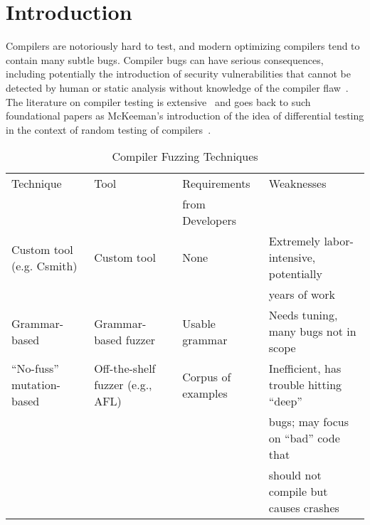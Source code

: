 \section{Introduction}

Compilers are notoriously hard to test, and modern optimizing
compilers tend to contain many subtle bugs.  Compiler bugs can have
serious consequences, including potentially the introduction of
security vulnerabilities that cannot be detected by human or static
analysis without knowledge of the compiler flaw~\cite{CompBug}.   The
literature on compiler testing is extensive~\cite{chen2020survey} and
goes back to such foundational papers as McKeeman's introduction of
the idea of differential testing in the context of random testing of
compilers~\cite{Differential}.

\begin{table*}
\centering
\begin{tabular}{l|l|l|l}
  \toprule
  Technique &  Tool & Requirements & Weaknesses \\
  & & from Developers & \\
  \midrule
  Custom tool (e.g. Csmith) & Custom tool & None & Extremely
                                                   labor-intensive,
                                                   potentially\\
  & & & years
        of work \\
  \hline
  Grammar-based & Grammar-based fuzzer & Usable grammar & Needs tuning, many
                                                          bugs not in
                                                          scope\\
\hline                                                          
  ``No-fuss'' mutation-based & Off-the-shelf fuzzer (e.g., AFL) & Corpus of
                                                           examples &
                                                                      Inefficient,
                                                                      has
                                                                      trouble
                                                                      hitting
                                                                      ``deep''\\
          & & & bugs; may focus on ``bad'' code that\\
   & & &should not
                  compile but causes crashes \\
  \hline
  \bottomrule
\end{tabular}
\caption{Compiler Fuzzing Techniques}
\label{tab:techniques}
\end{table*}
